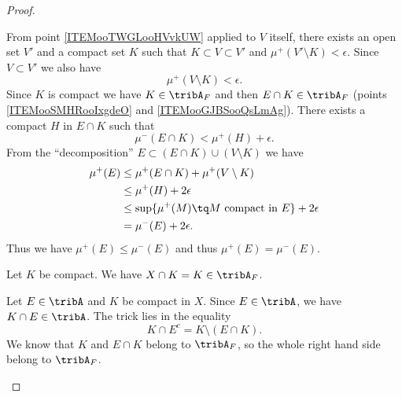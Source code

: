 \begin{proof}
\begin{subproof}
            From point \ref{ITEMooTWGLooHVvkUW} applied to \( V\) itself, there exists an open set \( V' \) and a compact set \( K\) such that \( K\subset V\subset V'\) and \( \mu^+(V'\setminus K)<\epsilon\). Since \( V\subset V'\) we also have
            \begin{equation}
                \mu^+(V\setminus K)<\epsilon.
            \end{equation}
            Since \( K\) is compact we have \( K\in \tribA_F\) and then \( E\cap K\in\tribA_F\) (points \ref{ITEMooSMHRooIxgdeO} and \ref{ITEMooGJBSooQsLmAg}). There exists a compact \( H\) in \( E\cap K\) such that
            \begin{equation}
                \mu^-(E\cap K)<\mu^+(H)+\epsilon.
            \end{equation}
            From the ``decomposition'' \( E\subset (E\cap K)\cup(V\setminus K)\) we have
            \begin{subequations}
                \begin{align}
                    \mu^+(E)&\leq \mu^+(E\cap K)+\mu^+(V\setminus K)\\
                    &\leq \mu^+(H)+2\epsilon\\
                    &\leq \sup\{ \mu^+(M)\tq \text{\( M\) compact in \( E\)} \}+2\epsilon\\
                    &=\mu^-(E)+2\epsilon.
                \end{align}
            \end{subequations}
            Thus we have \( \mu^+(E)\leq \mu^-(E)\) and thus \( \mu^+(E)=\mu^-(E)\).

            \spitem[\( X\in\tribA\)]
             
            Let \( K\) be compact. We have \( X\cap K=K\in \tribA_F\).


            Let \( E\in \tribA\) and \( K\) be compact in \( X\). Since \( E\in\tribA\), we have \( K\cap E\in\tribA\). The trick lies in the equality
            \begin{equation}
                K\cap E^c=K\setminus(E\cap K).
            \end{equation}
            We know that  \( K\) and \( E\cap K\) belong to \( \tribA_F\), so the whole right hand side belong to \( \tribA_F\).


\end{subproof}
\end{proof}
